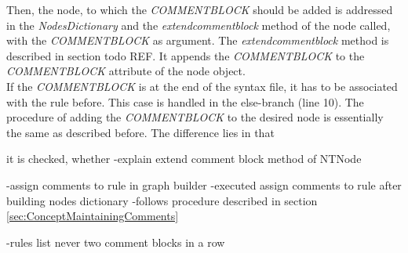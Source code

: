 Then, the node, to which the \textit{COMMENT\textunderscore BLOCK} should be added is addressed in the \textit{Nodes\textunderscore Dictionary} and the \textit{extend\textunderscore comment\textunderscore block} method of the node called, with the \textit{COMMENT\textunderscore BLOCK} as argument.
The \textit{extend\textunderscore comment\textunderscore block} method is described in section todo REF.
It appends the \textit{COMMENT\textunderscore BLOCK} to the \textit{COMMENT\textunderscore BLOCK} attribute of the node object.\\
If the \textit{COMMENT\textunderscore BLOCK} is at the end of the syntax file, it has to be associated with the rule before.
This case is handled in the else-branch (line 10).
The procedure of adding the \textit{COMMENT\textunderscore BLOCK} to the desired node is essentially the same as described before. The difference lies in that 

 it is checked, whether 
-explain extend comment block method of NTNode

-assign comments to rule in graph builder
-executed assign comments to rule after building nodes dictionary
-follows procedure described in section \ref{sec:ConceptMaintainingComments}

-rules list never two comment blocks in a row

